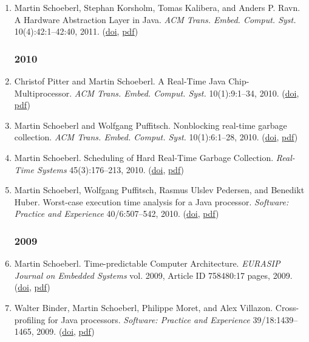 \begin{enumerate}
\item Martin Schoeberl, Stephan Korsholm, Tomas Kalibera, and Anders P. Ravn.
 A Hardware Abstraction Layer in Java.
 \emph{ACM Trans. Embed. Comput. Syst.} 10(4):42:1--42:40, 2011.
(\href{http://dx.doi.org/10.1145/2043662.2043666}{doi}, \href{http://www.jopdesign.com/doc/jhal.pdf}{pdf})


\subsubsection*{2010}

\item Christof Pitter and Martin Schoeberl.
 A Real-Time Java Chip-Multiprocessor.
 \emph{ACM Trans. Embed. Comput. Syst.} 10(1):9:1--34, 2010.
(\href{http://dx.doi.org/10.1145/1814539.1814548}{doi}, \href{http://www.jopdesign.com/doc/jopcmp_tecs.pdf}{pdf})

\item Martin Schoeberl and Wolfgang Puffitsch.
 Nonblocking real-time garbage collection.
 \emph{ACM Trans. Embed. Comput. Syst.} 10(1):6:1--28, 2010.
(\href{http://dx.doi.org/10.1145/1814539.1814545}{doi}, \href{http://www.jopdesign.com/doc/nbgc.pdf}{pdf})

\item Martin Schoeberl.
 Scheduling of Hard Real-Time Garbage Collection.
 \emph{Real-Time Systems} 45(3):176--213, 2010.
(\href{http://dx.doi.org/10.1007/s11241-010-9095-4}{doi}, \href{http://www.jopdesign.com/doc/hrtsgc.pdf}{pdf})

\item Martin Schoeberl, Wolfgang Puffitsch, Rasmus Ulslev Pedersen, and Benedikt Huber.
 Worst-case execution time analysis for a Java processor.
 \emph{Software: Practice and Experience} 40/6:507--542, 2010.
(\href{http://dx.doi.org/10.1002/spe.968}{doi}, \href{http://www.jopdesign.com/doc/wcetana.pdf}{pdf})


\subsubsection*{2009}

\item Martin Schoeberl.
 Time-predictable Computer Architecture.
 \emph{EURASIP Journal on Embedded Systems} vol. 2009, Article ID 758480:17 pages, 2009.
(\href{http://dx.doi.org/10.1155/2009/758480}{doi}, \href{http://www.jopdesign.com/doc/ca4rts.pdf}{pdf})

\item Walter Binder, Martin Schoeberl, Philippe Moret, and Alex Villazon.
 Cross-profiling for Java processors.
 \emph{Software: Practice and Experience} 39/18:1439--1465, 2009.
(\href{http://dx.doi.org/10.1002/spe.940}{doi}, \href{http://www.jopdesign.com/doc/cprof_spe.pdf}{pdf})



\end{enumerate}
